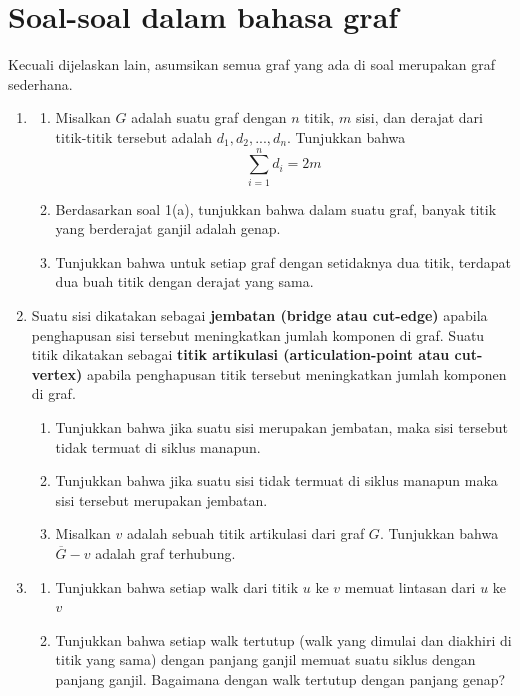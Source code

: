 \documentclass[11pt]{scrartcl}
\begin{document}
\section{Soal-soal dalam bahasa graf}
Kecuali dijelaskan lain, asumsikan semua graf yang ada di soal merupakan graf sederhana.
\begin{enumerate}
    \item 
    \begin{enumerate}
        \item Misalkan $G$ adalah suatu graf dengan $n$ titik, $m$ sisi, dan derajat dari titik-titik tersebut adalah $d_1, d_2, ..., d_n$. Tunjukkan bahwa $$\sum_{i = 1}^{n} d_i = 2m$$
        \item Berdasarkan soal 1(a), tunjukkan bahwa dalam suatu graf, banyak titik yang berderajat ganjil adalah genap.
        \item Tunjukkan bahwa untuk setiap graf dengan setidaknya dua titik, terdapat dua buah titik dengan derajat yang sama.
    \end{enumerate}
    \item Suatu sisi dikatakan sebagai \textbf{jembatan (bridge atau cut-edge)} apabila penghapusan sisi tersebut meningkatkan jumlah komponen di graf. Suatu titik dikatakan sebagai \textbf{titik artikulasi (articulation-point atau cut-vertex)} apabila penghapusan titik tersebut meningkatkan jumlah komponen di graf.
    \begin{enumerate}
        \item Tunjukkan bahwa jika suatu sisi merupakan jembatan, maka sisi tersebut tidak termuat di siklus manapun.
        \item Tunjukkan bahwa jika suatu sisi tidak termuat di siklus manapun maka sisi tersebut merupakan jembatan.
        \item Misalkan $v$ adalah sebuah titik artikulasi dari graf $G$. Tunjukkan bahwa $\overline{G} - v$ adalah graf terhubung.
    \end{enumerate}
    \item
    \begin{enumerate}
        \item Tunjukkan bahwa setiap walk dari titik $u$ ke $v$ memuat lintasan dari $u$ ke $v$
        \item Tunjukkan bahwa setiap walk tertutup (walk yang dimulai dan diakhiri di titik yang sama) dengan panjang ganjil memuat suatu siklus dengan panjang ganjil. Bagaimana dengan walk tertutup dengan panjang genap?
    \end{enumerate}

\end{enumerate}
\end{document}
